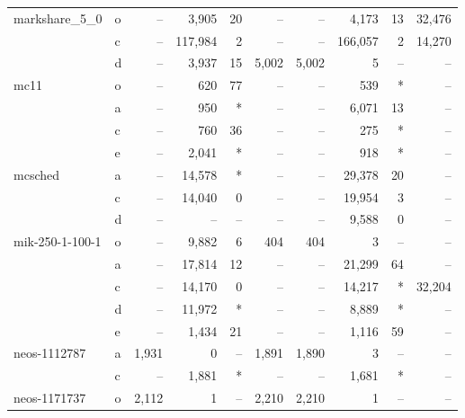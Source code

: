 \documentclass[11.5pt]{article}
\begin{document}
\begin{table}[H]
\begin{tabular}{l|l|rrr|rrrr|r}
markshare\_5\_0   & o & --    & 3,905 & 20 & --     & --    & 4,173 & 13   & 32,476\\
                  & c & --    &117,984& 2  & --     & --    &166,057& 2    & 14,270\\
                  & d & --    & 3,937 & 15 & 5,002  & 5,002 & 5     & --   & --\\
mc11              & o & --    & 620   & 77 & --     & --    & 539   & *    & --\\
                  & a & --    & 950   & *  & --     & --    & 6,071 & 13   & --\\
                  & c & --    & 760   & 36 & --     & --    & 275   & *    & --\\
                  & e & --    & 2,041 & *  & --     & --    & 918   & *    & --\\
mcsched           & a & --    &14,578 & *  & --     & --    & 29,378& 20   & --\\
                  & c & --    &14,040 & 0  & --     & --    & 19,954& 3    & --\\
                  & d & --    & --    & -- & --     & --    & 9,588 & 0    & --\\
mik-250-1-100-1   & o & --    & 9,882 & 6  & 404    & 404   & 3     & --   & --\\
                  & a & --    & 17,814& 12 & --     & --    & 21,299& 64   & --\\
                  & c & --    & 14,170& 0  & --     & --    & 14,217& *    & 32,204\\
                  & d & --    & 11,972& *  & --     & --    & 8,889 & *    & --\\
                  & e & --    & 1,434 & 21 & --     & --    & 1,116 & 59   & --\\
neos-1112787      & a & 1,931 & 0     & -- & 1,891  & 1,890 & 3     & --   & -- \\
                  & c & --    & 1,881 & *  & --     & --    & 1,681 & *    & -- \\
neos-1171737      & o & 2,112 & 1     & -- & 2,210  & 2,210 & 1     & --   & --\\

\end{tabular}
\end{table}
\end{document}
